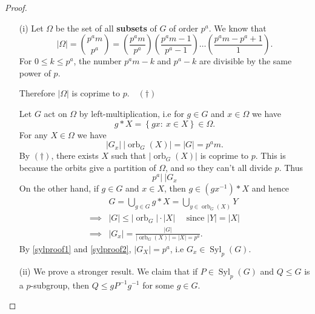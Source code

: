 \documentclass[egregdoesnotlikesansseriftitles,a4paper]{scrartcl}
\begin{document}
\begin{proof}
      \begin{itemize}
           \item[(i)] Let $\Omega$ be the set of all \textbf{subsets} of $G$ of order $p^{a}$. We know that \[
           |\Omega|= {p^{a}m \choose p^{a}}=\left( \frac{p^{a}m}{p^{a}}\right)\left( \frac{p^{a}m -1}{p^{a}-1}\right)\ldots \left( \frac{p^{a}m- p^{a}+1}{1}\right)
           .\] For $0 \leq k \leq p^{a}$, the number $p^{a}m-k$ and $p^{a}-k$ are divisible by the same power of $p$. 

           Therefore $|\Omega|$ is coprime to $p$.\hfill $\quad (\dagger)$ 

           Let $G$ act on $\Omega$ by left-multiplication, i.e for $g \in G$ and $x \in \Omega$ we have \[
           g \ast X= \left\{gx: \ x \in X\right\} \in \Omega
           .\] For any $X \in \Omega$ we have \[
           |G_{x}|\ |\operatorname{orb}_{G}(X)|=|G|=p^{a}m
           .\] By $(\dagger)$, there exists $X$ such that $|\operatorname{orb}_{G}(X)|$ is coprime to $p$. This is because the orbits give a partition of $\Omega$, and so they can't all divide $p$. Thus
           \begin{equation}\label{sylproof1}
               p^{a} | \ |G_{x}
           \end{equation}
            On the other hand, if $g \in G$ and $x \in X$, then $g \in (g {x}^{-1})\ast X$ and hence
           \begin{align}
               &G = \bigcup_{g \in G} g \ast X=\bigcup_{y \in \operatorname{orb}_{G}(X)} Y \nonumber\\ 
               \implies & |G| \leq |\operatorname{orb}_{G}| \cdot  |X| \quad \text{ since } |Y|=|X| \nonumber\\
               \implies & |G_{x}|= \frac{|G|}{|\operatorname{orb}_{G}(X)|=|X|=p^{a}} \label{sylproof2}.
           \end{align}
           By \ref{sylproof1} and \ref{sylproof2}, $|G_{X}|=p^{a}$, i.e $G_{x} \in \operatorname{Syl}_{p}(G)$.
           \item[(ii)] We prove a stronger result. We claim that if $P \in \operatorname{Syl}_{p}(G)$ and $Q \leq G$ is a $p$-subgroup, then $Q \leq g {P}^{-1} {g}^{-1}$ for some $g \in G$.
           

\end{itemize}
\end{proof}
\end{document}
